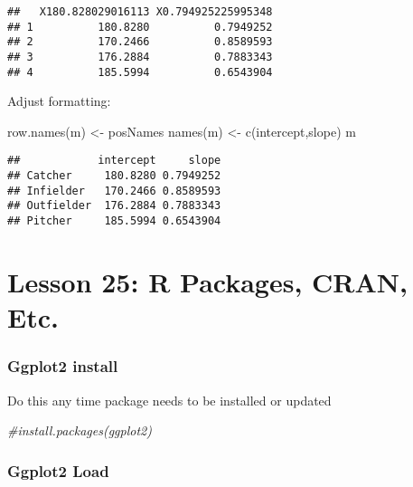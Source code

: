 \documentclass[
]{article}
\newenvironment{Shaded}{\begin{snugshade}}{\end{snugshade}}
\newcommand{\CommentTok}[1]{\textcolor[rgb]{0.56,0.35,0.01}{\textit{#1}}}
\newcommand{\FunctionTok}[1]{\textcolor[rgb]{0.00,0.00,0.00}{#1}}
\newcommand{\NormalTok}[1]{#1}
\newcommand{\OtherTok}[1]{\textcolor[rgb]{0.56,0.35,0.01}{#1}}
\newcommand{\StringTok}[1]{\textcolor[rgb]{0.31,0.60,0.02}{#1}}
\begin{document}
\begin{verbatim}
##   X180.828029016113 X0.794925225995348
## 1          180.8280          0.7949252
## 2          170.2466          0.8589593
## 3          176.2884          0.7883343
## 4          185.5994          0.6543904
\end{verbatim}

Adjust formatting:

\begin{Shaded}
\begin{Highlighting}[]
\FunctionTok{row.names}\NormalTok{(m) }\OtherTok{\textless{}{-}}\NormalTok{ posNames}
\FunctionTok{names}\NormalTok{(m) }\OtherTok{\textless{}{-}} \FunctionTok{c}\NormalTok{(}\StringTok{\textquotesingle{}intercept\textquotesingle{}}\NormalTok{,}\StringTok{\textquotesingle{}slope\textquotesingle{}}\NormalTok{)}
\NormalTok{m}
\end{Highlighting}
\end{Shaded}

\begin{verbatim}
##            intercept     slope
## Catcher     180.8280 0.7949252
## Infielder   170.2466 0.8589593
## Outfielder  176.2884 0.7883343
## Pitcher     185.5994 0.6543904
\end{verbatim}

\hypertarget{lesson-25-r-packages-cran-etc.}{%
\section{Lesson 25: R Packages, CRAN,
Etc.}\label{lesson-25-r-packages-cran-etc.}}

\hypertarget{ggplot2-install}{%
\subsubsection{Ggplot2 install}\label{ggplot2-install}}

Do this any time package needs to be installed or updated

\begin{Shaded}
\begin{Highlighting}[]
\CommentTok{\#install.packages(\textquotesingle{}ggplot2\textquotesingle{})}
\end{Highlighting}
\end{Shaded}

\hypertarget{ggplot2-load}{%
\subsubsection{Ggplot2 Load}\label{ggplot2-load}}
\end{document}
